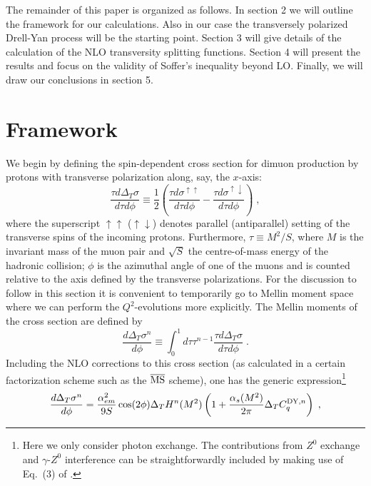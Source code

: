 The remainder of this paper is organized as follows. In section 2 we will
outline the framework for our calculations. Also in our case the transversely
polarized Drell-Yan process will be the starting point. Section 3 will
give details of the calculation of the NLO transversity splitting functions.
Section 4 will present the results and focus on the validity of Soffer's 
inequality beyond LO. Finally, we will draw our conclusions in section 5.
%
\section{Framework}
%
We begin by defining the spin-dependent cross section for dimuon 
production by protons with transverse polarization along, say, the 
$x$-axis:
\begin{equation} \label{wqdef}
\frac{\tau d\Delta_T \sigma}{d \tau d\phi} \equiv
\frac{1}{2} \left( \frac{\tau d\sigma^{\uparrow \uparrow}}{d 
\tau d\phi} - \frac{\tau d\sigma^{\uparrow \downarrow}}{d \tau d\phi}
\right) \; ,
\end{equation}
where the superscript $\uparrow \uparrow$ ($\uparrow \downarrow$)
denotes parallel (antiparallel) setting of the transverse spins
of the incoming protons. Furthermore, $\tau \equiv M^2/S$, where 
$M$ is the invariant mass of the muon pair and $\sqrt{S}$ the
centre-of-mass energy of the hadronic collision; $\phi$ is the azimuthal 
angle of one of the muons and is counted relative to the axis defined 
by the transverse polarizations. For the discussion to follow in this section
it is convenient to temporarily go to Mellin moment space where we can
perform the $Q^2$-evolutions more explicitly. The Mellin moments of the 
cross section are defined by
\begin{equation} \label{mellin}
\frac{d\Delta_T \sigma^n}{d\phi} \equiv \int_0^1 d\tau \tau^{n-1}
\frac{\tau d\Delta_T \sigma}{d \tau d\phi} \; .
\end{equation}
Including the NLO corrections to this cross section (as calculated in 
a certain factorization scheme such as the $\overline{{\mbox{\rm MS}}}$ 
scheme), one has the generic expression\footnote{Here we only consider photon 
exchange. The contributions from $Z^0$ exchange and $\gamma$-$Z^0$ 
interference can be straightforwardly included by making use of Eq.~(3) of 
\cite{cont1}.} 
\cite{alex,cont1}
\begin{equation} \label{nlogen}
\frac{d\Delta_T \sigma^n}{d\phi} = \frac{\alpha_{em}^2}{9S} \cos (2 \phi)
\Delta_T H^n (M^2) \left( 1 + \frac{\alpha_s (M^2)}{2\pi} \Delta_T C_q^{
{\small {\rm DY}},n} 
\right) \; ,
\end{equation}
